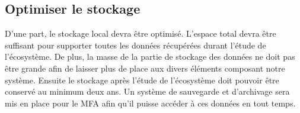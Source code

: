 

\subsection{Optimiser le stockage}
\label{s:beo_obj_stockage}

D’une part, le stockage local devra être optimisé.
L’espace total devra être suffisant pour supporter toutes les données récupérées durant l’étude de l’écosystème.
De plus, la masse de la partie de stockage des données ne doit pas être grande afin de laisser plus de place aux divers éléments composant notre système.
\wl
Ensuite le stockage après l’étude de l’écosystème doit pouvoir être conservé au minimum deux ans.
Un système de sauvegarde et d’archivage sera mis en place pour le MFA afin qu’il puisse accéder à ces données en tout temps.
